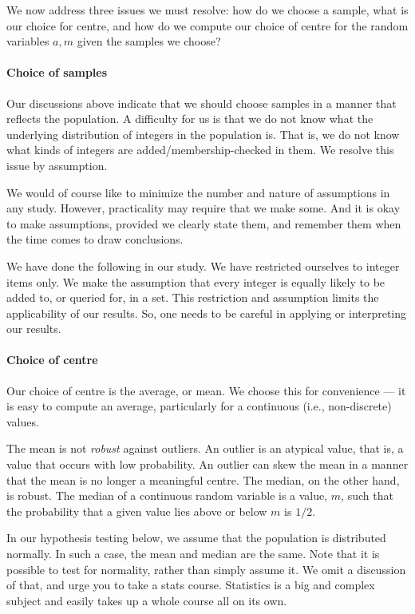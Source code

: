 We now address three issues we must resolve: how do we choose
a sample, what is our choice for centre, and how do we compute
our choice of centre for the random variables $a,m$ given the
samples we choose?

\paragraph{Choice of samples} Our discussions above indicate that
we should choose samples in a manner that reflects the population.
A difficulty for us is that we do not know what the underlying
distribution of integers in the population is.
That is, we do not know what kinds of 
integers are added/membership-checked
in them. We resolve this issue by assumption.

We would of course like to minimize the number and nature of
assumptions in any study. However, practicality may require that
we make some. And it is okay to make assumptions, provided
we clearly state them, and remember them when the time comes to draw conclusions.

We have done the following in our study.
We have restricted ourselves to integer items only.
We make the assumption that every integer is
equally likely to be added to, or queried for, in a set.
This restriction and assumption limits the applicability
of our results. So, one needs to be careful in applying or
interpreting our results.

\paragraph{Choice of centre} Our choice of centre is the
average, or mean. We choose this for convenience --- it is
easy to compute an average, particularly for a continuous
(i.e., non-discrete) values.

The mean is not \emph{robust} against outliers.
An outlier is an atypical value, that is, a value that occurs
with low probability. An outlier can skew the mean in a manner
that the mean is no longer a meaningful centre.
The median, on the other hand, is robust.
The median of a continuous random variable is a value, $m$,
such that the probability that a given value lies above
or below $m$ is $1/2$.

In our hypothesis testing below, we assume that the population
is distributed normally. In such a case, the mean and median
are the same. Note that it is possible to test for normality,
rather than simply assume it. We omit a discussion of that, and
urge you to take a stats course. Statistics is a big and complex
subject and easily takes up a whole course all on its own.


